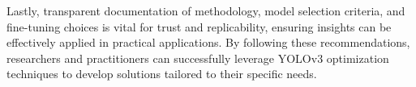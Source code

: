 Lastly, transparent documentation of methodology, model selection criteria, and fine-tuning choices is vital for trust and replicability, ensuring insights can be effectively applied in practical applications. By following these recommendations, researchers and practitioners can successfully leverage YOLOv3 optimization techniques to develop solutions tailored to their specific needs.